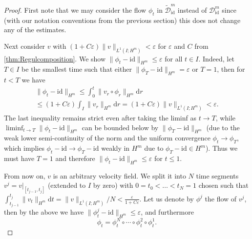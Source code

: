 \documentclass[a4paper, 12pt]{article}
\renewcommand{\d}{\mathrm{d}}
\newcommand{\id}{\mathrm{id}}
\newcommand{\DiffSobId}{\mathcal D_{\id}}
\newcommand{\DiffSobIdLift}{\widetilde{\mathcal D}_{\id}}
\begin{document}
\begin{proof}
First note that %
we may consider the flow $\phi_t$ in $\DiffSobIdLift^m$ instead of $\DiffSobId^m$ since (with our notation conventions from the previous section) this does not change any of the estimates.

Next consider $v$ with $(1+C\varepsilon)\|v\|_{L^1(I;H^m)}<\varepsilon$ for $\varepsilon$ and $C$ from \cref{thm:Regulcomposition}.
We show $\|\phi_t-\id\|_{H^m}\leq\varepsilon$ for all $t\in I$.
Indeed, let $T\in I$ be the smallest time such that either $\|\phi_T-\id\|_{H^m}=\varepsilon$ or $T=1$, then for $t<T$ we have
\begin{multline}\label{eqn:distFromId}
\|\phi_t-\id\|_{H^m}
\leq\int_0^t\|v_r\circ\phi_r\|_{H^m}\d r\\
\leq(1+C\varepsilon)\int_I\|v_r\|_{H^m}\d r
=(1+C\varepsilon)\|v\|_{L^1(I;H^m)}<\varepsilon.
\end{multline}
The last inequality remains strict even after taking the liminf as $t\to T$,
while $\liminf_{t\to T}\|\phi_t-\id\|_{H^m}$ can be bounded below by $\|\phi_T-\id\|_{H^m}$
(due to the weak lower semi-continuity of the norm and the uniform convergence $\phi_t\to\phi_T$, which implies $\phi_t-\id\to\phi_T-\id$ weakly in $H^m$ due to $\phi_T-\id\in H^m$).
Thus we must have $T=1$ and therefore $\|\phi_t-\id\|_{H^m}\leq\varepsilon$ for $t\leq1$.

From now on, $v$ is an arbitrary velocity field.
We split it into $N$ time segments $v^j=v|_{[t_{j-1},t_{j}]}$ (extended to $I$ by zero)
with $0=t_0<\ldots<t_N=1$ chosen such that $\int_{t_{j-1}}^{t_{j}}\|v_t\|_{H^m}\d t=\|v\|_{L^1(I;H^m)}/N<\frac\varepsilon{1+C\varepsilon}$.
Let us denote by $\phi^j$ the flow of $v^j$, then by the above we have $\|\phi^j_t-\id\|_{H^m}\leq\varepsilon$, and furthermore
\begin{equation*}
\phi_t=\phi^N_t\circ\cdots\circ\phi^2_t\circ\phi^1_t.
\end{equation*}


\end{proof}
\end{document}
